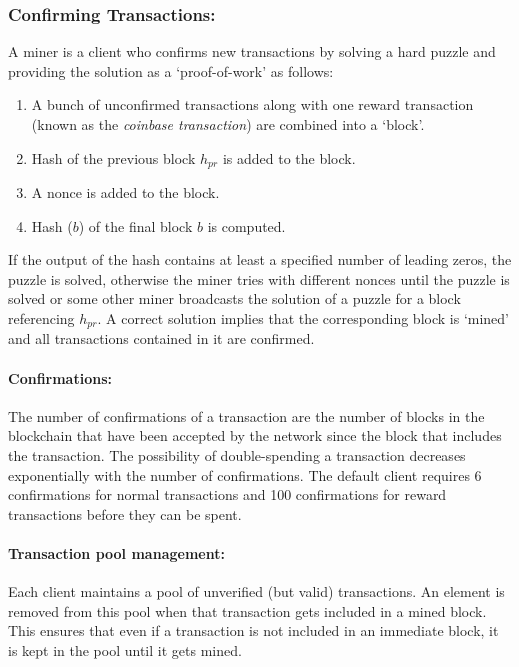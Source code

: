 \documentclass[]{report}   %
\begin{document}
\subsubsection{Confirming Transactions:}
\label{sec:verify}
A miner is a client who confirms new transactions by solving a hard puzzle and providing the solution as a `proof-of-work'  as follows: 
\begin{enumerate}
	\item A bunch of unconfirmed transactions along with one reward transaction %
	(known as the \emph{coinbase transaction}) are combined into a `block'.
	\item Hash of the previous block $h_{pr}$ is added to the block. %
	\item A nonce is added to the block.
	\item Hash%
	($b$) %
	 of the final block $b$ is computed. 	
\end{enumerate}

If the output of the hash contains at least a specified number of leading zeros, the puzzle is solved, otherwise the miner tries with different nonces until the puzzle is solved or some other miner broadcasts the solution of a puzzle for a block referencing $h_{pr}$. A correct solution implies that the corresponding block is `mined' and all transactions contained in it are confirmed.

\paragraph{Confirmations:} The number of confirmations of a transaction are the number of blocks in the blockchain that have been accepted by the network since the block that includes the transaction. The possibility of double-spending a transaction decreases exponentially with the number of confirmations. The default client requires 6 confirmations for normal transactions and 100 confirmations for reward transactions before they can be spent.  

\paragraph{Transaction pool management:} Each client maintains a pool of unverified (but valid) transactions. An element is removed from this pool when that transaction gets included in a mined block. This ensures that even if a transaction is not included in an immediate block, it is kept in the pool until it gets mined. %
\end{document}
